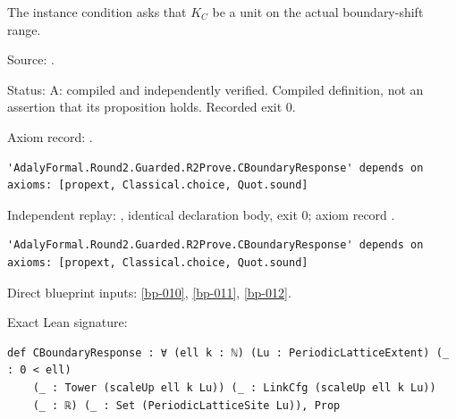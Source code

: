 \begin{definition}[bp-013]
\label{bp-013}
\leanok
The instance condition asks that \(K_C\) be a unit on the actual boundary-shift range.

\par Source: \texttt{}.
\par Status: A: compiled and independently verified. Compiled definition, not an assertion that its proposition holds. Recorded exit 0.
\par Axiom record: \texttt{}.
\begin{verbatim}
'AdalyFormal.Round2.Guarded.R2Prove.CBoundaryResponse' depends on axioms: [propext, Classical.choice, Quot.sound]
\end{verbatim}
\par Independent replay: \texttt{}, identical declaration body, exit 0; axiom record \texttt{}.
\begin{verbatim}
'AdalyFormal.Round2.Guarded.R2Prove.CBoundaryResponse' depends on axioms: [propext, Classical.choice, Quot.sound]
\end{verbatim}
\par Direct blueprint inputs: \ref{bp-010}, \ref{bp-011}, \ref{bp-012}.
\par Exact Lean signature:
\begin{verbatim}
def CBoundaryResponse : ∀ (ell k : ℕ) (Lu : PeriodicLatticeExtent) (_ : 0 < ell)
    (_ : Tower (scaleUp ell k Lu)) (_ : LinkCfg (scaleUp ell k Lu))
    (_ : ℝ) (_ : Set (PeriodicLatticeSite Lu)), Prop
\end{verbatim}
\end{definition}

